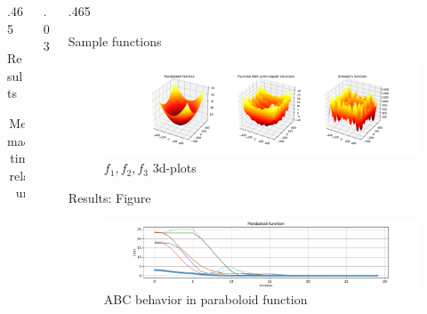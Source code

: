 \documentclass[final,hyperref]{beamer}
\begin{document}
\begin{frame}[t]
\begin{columns}[t]
\begin{column}{.465\textwidth}
\begin{block}{Results}
\begin{table}
\begin{tabular}{r|c c c c}
		\end{tabular}

		\caption{Median machine time in relative units}
	\end{table}
 

\end{block}



\end{column} %

\begin{column}{.03\textwidth}\end{column} %
 
\begin{column}{.465\textwidth} %



\begin{block}{Sample functions}

	
\begin{figure}[H]
	\includegraphics[width=1.0\linewidth]{samples.pdf}
	\caption{$f_1, f_2, f_3$ 3d-plots}
\end{figure}

\end{block}



\begin{block}{Results: Figure}

\begin{figure}[H]
	\includegraphics[width=0.9\linewidth]{paraboloid_tr.pdf}
	\caption{ABC behavior in paraboloid function}
\end{figure}


\end{block}
\end{column}
\end{columns}
\end{frame}
\end{document}
